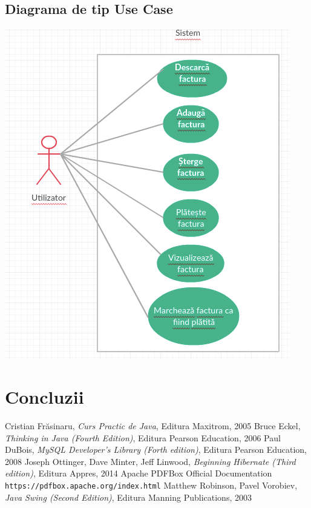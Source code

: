 \documentclass[12pt]{book}
\begin{document}
\section{Diagrama de tip Use Case}
\begin{center}
	\includegraphics{UseCaseDiagram}
\end{center}

\chapter{Concluzii}

\begin{thebibliography}{9}
	  Cristian Frăsinaru, {\em Curs Practic de Java}, Editura Maxitrom, 2005
	  Bruce Eckel, {\em Thinking in Java (Fourth Edition)}, Editura Pearson Education, 2006
	 Paul DuBois, {\em MySQL Developer's Library (Forth edition)}, Editura Pearson Education, 2008
	 Joseph Ottinger, Dave Minter, Jeff Linwood, {\em Beginning Hibernate (Third edition)}, Editura Appres, 2014
	 Apache PDFBox Official Documentation
	\\\texttt{https://pdfbox.apache.org/index.html}
	 Matthew Robinson, Pavel Vorobiev, {\em Java Swing (Second Edition)}, Editura Manning Publications, 2003
\end{thebibliography}
	
\end{document}
